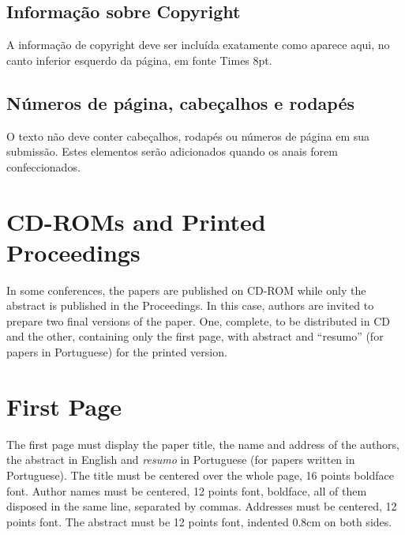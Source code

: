 \documentclass[12pt]{article}
\begin{document}
\subsection{Informação sobre Copyright}

A informação de copyright deve ser incluída exatamente como aparece
aqui, no canto inferior esquerdo da página, em fonte Times 8pt.

\subsection{Números de página, cabeçalhos e rodapés}

O texto não deve conter cabeçalhos, rodapés ou números de página em sua submissão.
Estes elementos serão adicionados quando os anais forem
confeccionados.


\section{CD-ROMs and Printed Proceedings}

In some conferences, the papers are published on CD-ROM while only the
abstract is published in the Proceedings. In this case, authors are
invited to prepare two final versions of the paper. One, complete, to
be distributed in CD and the other, containing only the first page,
with abstract and ``resumo'' (for papers in Portuguese) for the
printed version.

\section{First Page}

The first page must display the paper title, the name and address of
the authors, the abstract in English and \emph{resumo} in Portuguese (for
papers written in Portuguese). The title must be centered over the
whole page, 16 points boldface font. Author names must be centered,
12 points font, boldface, all of them disposed in the same line,
separated by commas. Addresses must be centered, 12 points font. The
abstract must be 12 points font, indented 0.8cm on both sides.
\end{document}
